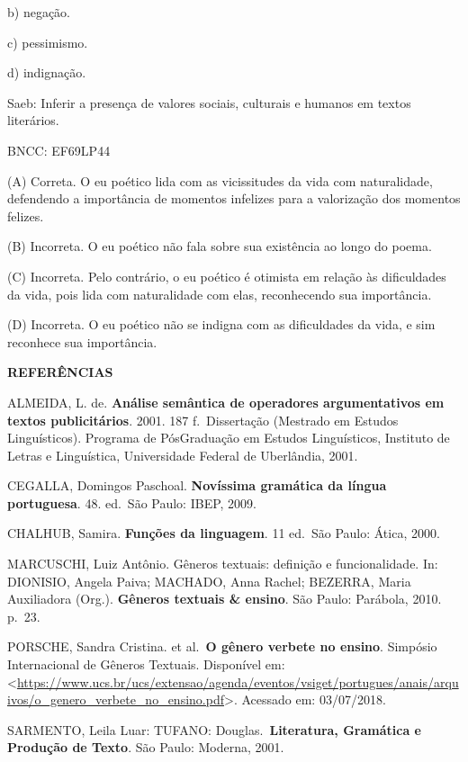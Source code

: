 b) negação.

c) pessimismo.

d) indignação.

Saeb: Inferir a presença de valores sociais, culturais e humanos em
textos literários.

BNCC: EF69LP44

(A) Correta. O eu poético lida com as vicissitudes da vida com
naturalidade, defendendo a importância de momentos infelizes para a
valorização dos momentos felizes.

(B) Incorreta. O eu poético não fala sobre sua existência ao longo do
poema.

(C) Incorreta. Pelo contrário, o eu poético é otimista em relação às
dificuldades da vida, pois lida com naturalidade com elas, reconhecendo
sua importância.

(D) Incorreta. O eu poético não se indigna com as dificuldades da vida,
e sim reconhece sua importância.

\textbf{REFERÊNCIAS}

ALMEIDA, L. de. \textbf{Análise semântica de operadores argumentativos
em textos publicitários}. 2001. 187 f.~Dissertação (Mestrado em Estudos
Linguísticos). Programa de PósGraduação em Estudos Linguísticos,
Instituto de Letras e Linguística, Universidade Federal de Uberlândia,
2001.

CEGALLA, Domingos Paschoal. \textbf{Novíssima gramática da língua
portuguesa}. 48. ed.~São Paulo: IBEP, 2009.

CHALHUB, Samira. \textbf{Funções da linguagem}. 11 ed.~São Paulo: Ática,
2000.

MARCUSCHI, Luiz Antônio. Gêneros textuais: definição e funcionalidade.
In: DIONISIO, Angela Paiva; MACHADO, Anna Rachel; BEZERRA, Maria
Auxiliadora (Org.). \textbf{Gêneros textuais \& ensino}. São Paulo:
Parábola, 2010. p.~23.

PORSCHE, Sandra Cristina. et al.~\textbf{O gênero verbete no ensino}.
Simpósio Internacional de Gêneros Textuais. Disponível em:
\textless{}\url{https://www.ucs.br/ucs/extensao/agenda/eventos/vsiget/portugues/anais/arquivos/o_genero_verbete_no_ensino.pdf}\textgreater.
Acessado em: 03/07/2018.

SARMENTO, Leila Luar: TUFANO: Douglas.~\textbf{Literatura, Gramática e
Produção de Texto}. São Paulo: Moderna, 2001.
